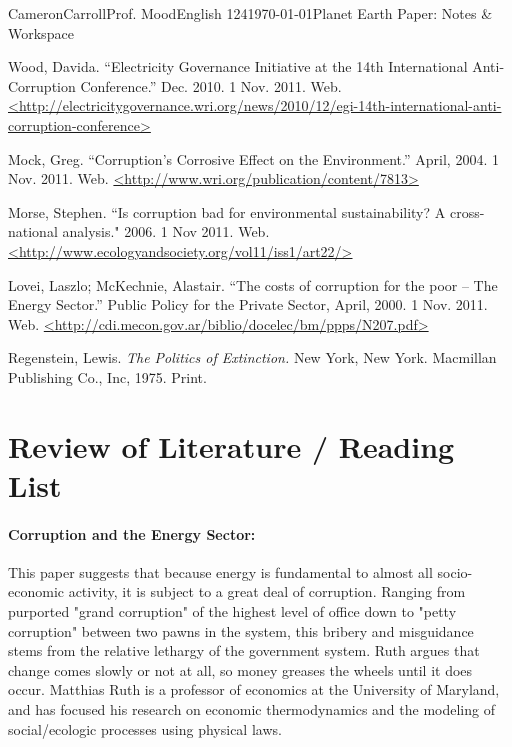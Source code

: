 \documentclass[12pt,letterpaper]{article}
\begin{document}
\begin{mla}{Cameron}{Carroll}{Prof. Mood}{English 124}{\today}{Planet Earth Paper: Notes \& Workspace}
\begin{workscited}
\bibent
Wood, Davida. ``Electricity Governance Initiative at the 14th International Anti-Corruption Conference.'' Dec. 2010. 1 Nov. 2011. Web. \url{<http://electricitygovernance.wri.org/news/2010/12/egi-14th-international-anti-corruption-conference>}

\bibent
Mock, Greg. ``Corruption's Corrosive Effect on the Environment.'' April, 2004. 1 Nov. 2011. Web. \url{<http://www.wri.org/publication/content/7813>}

\bibent
Morse, Stephen. ``Is corruption bad for environmental sustainability? A cross-national analysis." 2006. 1 Nov 2011. Web. \url{<http://www.ecologyandsociety.org/vol11/iss1/art22/>}

\bibent
Lovei, Laszlo; McKechnie, Alastair. ``The costs of corruption for the poor -- The Energy Sector.'' Public Policy for the Private Sector, April, 2000. 1 Nov. 2011. Web. \url{<http://cdi.mecon.gov.ar/biblio/docelec/bm/ppps/N207.pdf>}




\bibent
Regenstein, Lewis. \emph{The Politics of Extinction.} New York, New York. Macmillan Publishing Co., Inc, 1975. Print.



\end{workscited}

\section*{Review of Literature / Reading List}
\paragraph{\cite{msi_ruth_02} Corruption and the Energy Sector:} This paper suggests that because energy is fundamental to almost all socio-economic activity, it is subject to a great deal of corruption. Ranging from purported "grand corruption" of the highest level of office down to "petty corruption" between two pawns in the system, this bribery and misguidance stems from the relative lethargy of the government system. Ruth argues that change comes slowly or not at all, so money greases the wheels until it does occur. Matthias Ruth is a professor of economics at the University of Maryland, and has focused his research on economic thermodynamics and the modeling of social/ecologic processes using physical laws.


\end{mla}
\end{document}
